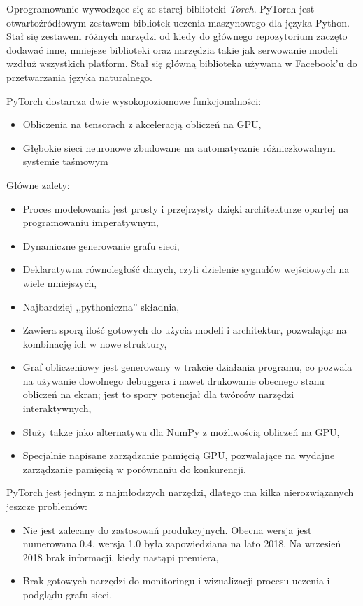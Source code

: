 \documentclass[12pt,a4paper,twoside,titlepage,openright]{book}
\begin{document}
\begin{itemize}
Oprogramowanie wywodzące się ze starej biblioteki \textit{Torch}. PyTorch jest otwartoźródłowym zestawem bibliotek uczenia maszynowego dla języka Python. Stał się zestawem różnych narzędzi od kiedy do głównego repozytorium zaczęto dodawać inne, mniejsze biblioteki oraz narzędzia takie jak serwowanie modeli wzdłuż wszystkich platform. Stał się główną biblioteka używana w Facebook'u do przetwarzania języka naturalnego. 

PyTorch dostarcza dwie wysokopoziomowe funkcjonalności:
\begin{itemize}
\item Obliczenia na tensorach z akceleracją obliczeń na GPU,
\item Głębokie sieci neuronowe zbudowane na automatycznie różniczkowalnym systemie taśmowym
\end{itemize}

Główne zalety:
\begin{itemize}
\item Proces modelowania jest prosty i przejrzysty dzięki architekturze opartej na programowaniu imperatywnym,
\item Dynamiczne generowanie grafu sieci,
\item Deklaratywna równoległość danych, czyli dzielenie sygnałów wejściowych na wiele mniejszych,
\item Najbardziej ,,pythoniczna'' składnia,
\item Zawiera sporą ilość gotowych do użycia modeli i architektur, pozwalając na kombinację ich w nowe struktury,
\item Graf obliczeniowy jest generowany w trakcie działania programu, co pozwala na używanie dowolnego debuggera i nawet drukowanie obecnego stanu obliczeń na ekran; jest to spory potencjał dla twórców narzędzi interaktywnych,
\item Służy także jako alternatywa dla NumPy z możliwością obliczeń na GPU,
\item Specjalnie napisane zarządzanie pamięcią GPU, pozwalające na wydajne zarządzanie pamięcią w porównaniu do konkurencji.
\end{itemize}

PyTorch jest jednym z najmłodszych narzędzi, dlatego ma kilka nierozwiązanych jeszcze problemów:
\begin{itemize}
\item Nie jest zalecany do zastosowań produkcyjnych. Obecna wersja jest numerowana 0.4, wersja 1.0 była zapowiedziana na lato 2018. Na wrzesień 2018 brak informacji, kiedy nastąpi premiera,
\item Brak gotowych narzędzi do monitoringu i wizualizacji procesu uczenia i podglądu grafu sieci.
\end{itemize}


\end{itemize}
\end{document}
